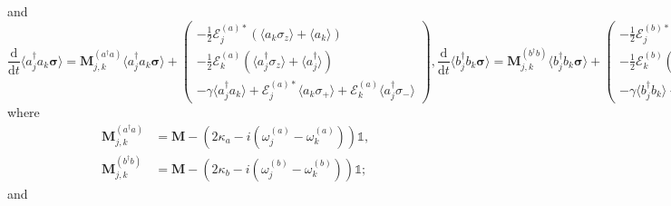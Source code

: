 \documentclass{article}
\newcommand{\ddt}[1][]{\frac{\mathrm{d} #1}{\mathrm{d}t}}
\begin{document}
and
\begin{subequations}
	\begin{equation}
		\ddt \langle a^{\dagger}_{j} a_{k} \bm{\sigma} \rangle = \bm{M}_{j, k}^{(a^{\dagger} a)} \langle a^{\dagger}_{j} a_{k} \bm{\sigma} \rangle + 
		\begin{pmatrix}
			-\frac{1}{2} \mathcal{E}_{j}^{(a) *} \left( \langle a_{k} \sigma_{z} \rangle + \langle a_{k} \rangle \right) \\
			-\frac{1}{2} \mathcal{E}_{k}^{(a)} \left( \langle a^{\dagger}_{j} \sigma_{z} \rangle + \langle a^{\dagger}_{j} \rangle \right) \\
			-\gamma \langle a^{\dagger}_{j} a_{k} \rangle + \mathcal{E}_{j}^{(a) *} \langle a_{k} \sigma_{+} \rangle + \mathcal{E}_{k}^{(a)} \langle a^{\dagger}_{j} \sigma_{-} \rangle
		\end{pmatrix},
	\end{equation}
	\begin{equation}
		\ddt \langle b^{\dagger}_{j} b_{k} \bm{\sigma} \rangle = \bm{M}_{j, k}^{(b^{\dagger} b)} \langle b^{\dagger}_{j} b_{k} \bm{\sigma} \rangle + 
		\begin{pmatrix}
			-\frac{1}{2} \mathcal{E}_{j}^{(b) *} \left( \langle b_{k} \sigma_{z} \rangle + \langle b_{k} \rangle \right) \\
			-\frac{1}{2} \mathcal{E}_{k}^{(b)} \left( \langle b^{\dagger}_{j} \sigma_{z} \rangle + \langle b^{\dagger}_{j} \rangle \right) \\
			-\gamma \langle b^{\dagger}_{j} b_{k} \rangle + \mathcal{E}_{j}^{(b) *} \langle b_{k} \sigma_{+} \rangle + \mathcal{E}_{k}^{(b)} \langle b^{\dagger}_{j} \sigma_{-} \rangle
		\end{pmatrix},
	\end{equation}
\end{subequations}
where
\begin{subequations}
	\begin{align}
		\bm{M}_{j, k}^{(a^{\dagger} a)} &= \bm{M} - \left( 2 \kappa_{a} - i \left( \omega_{j}^{(a)} - \omega_{k}^{(a)} \right) \right) \mathbb{1}, \\
		\bm{M}_{j, k}^{(b^{\dagger} b)} &= \bm{M} - \left( 2 \kappa_{b} - i \left( \omega_{j}^{(b)} - \omega_{k}^{(b)} \right) \right) \mathbb{1};
	\end{align}
\end{subequations}
and
\end{document}
